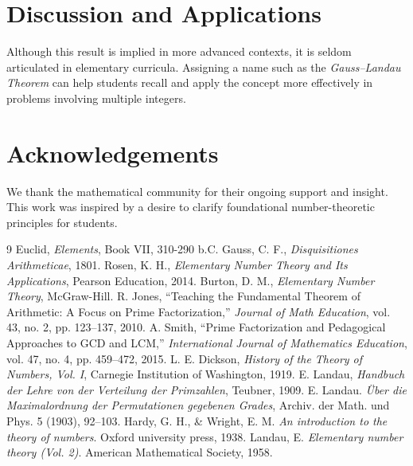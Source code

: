\documentclass[11pt]{article}
\theoremstyle{plain}
\begin{document}
\section{Discussion and Applications}

Although this result is implied in more advanced contexts, it is seldom articulated in elementary curricula. Assigning a name such as the \emph{Gauss–Landau Theorem} can help students recall and apply the concept more effectively in problems involving multiple integers.

\section*{Acknowledgements}
We thank the mathematical community for their ongoing support and insight. This work was inspired by a desire to clarify foundational number-theoretic principles for students.

\begin{thebibliography}{9}
 Euclid, \emph{Elements}, Book VII, 310-290 b.C.
 Gauss, C. F., \emph{Disquisitiones Arithmeticae}, 1801.
 Rosen, K. H., \emph{Elementary Number Theory and Its Applications}, Pearson Education, 2014.
 Burton, D. M., \emph{Elementary Number Theory}, McGraw-Hill.
R. Jones, “Teaching the Fundamental Theorem of Arithmetic: A Focus on Prime Factorization,” \emph{Journal of Math Education}, vol. 43, no. 2, pp. 123–137, 2010.
A. Smith, “Prime Factorization and Pedagogical Approaches to GCD and LCM,” \emph{International Journal of Mathematics Education}, vol. 47, no. 4, pp. 459–472, 2015.
L. E. Dickson, \emph{History of the Theory of Numbers, Vol. I}, Carnegie Institution of Washington, 1919.
E. Landau, \emph{Handbuch der Lehre von der Verteilung der Primzahlen}, Teubner, 1909.
E. Landau. \emph{Über die Maximalordnung der Permutationen gegebenen Grades},
Archiv. der Math. und Phys. 5 (1903), 92–103.
Hardy, G. H., \& Wright, E. M. \emph{An introduction to the theory of numbers}. Oxford university press, 1938.
Landau, E. \emph{Elementary number theory (Vol. 2)}. American Mathematical Society, 1958.
\end{thebibliography}
\end{document}
